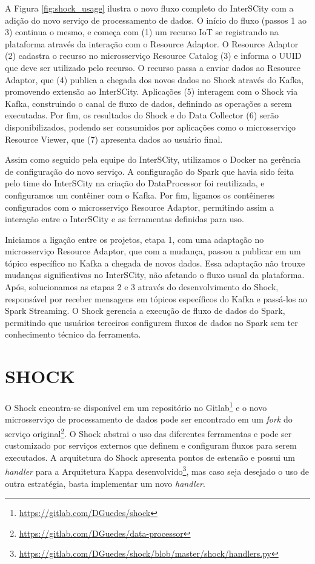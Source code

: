 A Figura \ref{fig:shock_usage} ilustra o novo fluxo completo do InterSCity com a
adição do novo serviço de processamento de dados. O início do fluxo (passos 1 ao
3) continua o mesmo, e começa com (1) um recurso IoT se registrando na plataforma
através da interação com o Resource Adaptor. O Resource Adaptor (2) cadastra o
recurso no microsserviço Resource Catalog (3) e informa o UUID que deve ser
utilizado pelo recurso. O recurso passa a enviar dados ao Resource Adaptor, que
(4) publica a chegada dos novos dados no Shock através do Kafka, promovendo
extensão ao InterSCity.  Aplicações (5) interagem com o Shock via Kafka,
construindo o canal de fluxo de dados, definindo as operações a
serem executadas.  Por fim, os resultados do Shock e do Data Collector (6)
serão disponibilizados, podendo ser consumidos por aplicações como o
microsserviço Resource Viewer, que (7) apresenta dados ao usuário final.

Assim como seguido pela equipe do InterSCity, utilizamos o Docker na gerência de
configuração do novo serviço. A configuração do Spark que havia sido feita pelo
time do InterSCity na criação do DataProcessor foi reutilizada, e configuramos
um contêiner com o Kafka. Por fim, ligamos os contêineres configurados com o
microsserviço Resource Adaptor, permitindo assim a interação entre o InterSCity
e as ferramentas definidas para uso.

Iniciamos a ligação entre os projetos, etapa 1, com uma adaptação no
microsserviço Resource Adaptor, que com a mudança, passou a publicar em um tópico
específico no Kafka a chegada de novos dados. Essa adaptação não trouxe mudanças
significativas no InterSCity, não afetando o fluxo usual da plataforma.
Após, solucionamos as etapas 2 e 3 através do desenvolvimento do Shock,
responsável por receber mensagens em tópicos específicos do Kafka e passá-los
ao Spark Streaming. O Shock gerencia a execução de fluxo de dados do Spark,
permitindo que usuários terceiros configurem fluxos de dados no Spark sem ter
conhecimento técnico da ferramenta.

\section{SHOCK}

O Shock encontra-se disponível em um repositório no
Gitlab\footnote{\url{https://gitlab.com/DGuedes/shock}} e o novo microsserviço
de processamento de dados pode ser encontrado em um \textit{fork} do serviço
original\footnote{\url{https://gitlab.com/DGuedes/data-processor}}. O Shock
abstrai o uso das diferentes ferramentas e pode ser customizado
por serviços externos que definem e configuram fluxos para serem
executados. A arquitetura do Shock apresenta pontos de estensão e possui
um \textit{handler} para a Arquitetura Kappa
desenvolvido\footnote{\url{https://gitlab.com/DGuedes/shock/blob/master/shock/handlers.py}},
mas caso seja desejado o uso de outra estratégia, basta implementar um novo
\textit{handler}.

